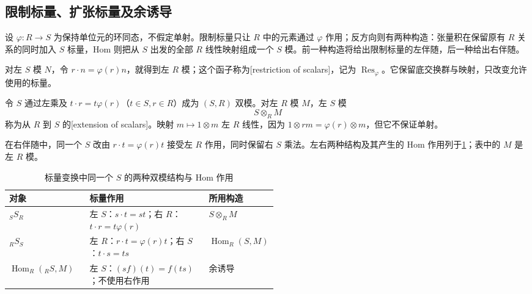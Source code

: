 \subsection{限制标量、扩张标量及余诱导}
\label{b2:subsec:0603:03}

设 \(\varphi:R\to S\) 为保持单位元的环同态，不假定单射。限制标量只让 \(R\) 中的元素通过 \(\varphi\) 作用；反方向则有两种构造：张量积在保留原有 \(R\) 关系的同时加入 \(S\) 标量，Hom 则把从 \(S\) 出发的全部 \(R\) 线性映射组成一个 \(S\) 模。前一种构造将给出限制标量的左伴随，后一种给出右伴随。

\ProseParagraphBreak
对左 \(S\) 模 \(N\)，令 \(r\cdot n=\varphi(r)n\)，就得到左 \(R\) 模；这个函子称为[restriction of scalars]，记为 \(\operatorname{Res}_{\varphi}\)。它保留底交换群与映射，只改变允许使用的标量。

\ProseParagraphBreak
令 \(S\) 通过左乘及 \(t\cdot r=t\varphi(r)\)（\(t\in S,r\in R\)）成为 \((S,R)\) 双模。对左 \(R\) 模 \(M\)，左 \(S\) 模
\[
	S\otimes_RM
\]
称为从 \(R\) 到 \(S\) 的[extension of scalars]。映射 \(m\mapsto1\otimes m\) 左 \(R\) 线性，因为 \(1\otimes rm=\varphi(r)\otimes m\)，但它不保证单射。

\ProseParagraphBreak
在右伴随中，同一个 \(S\) 改由 \(r\cdot t=\varphi(r)t\) 接受左 \(R\) 作用，同时保留右 \(S\) 乘法。左右两种结构及其产生的 Hom 作用列于\cref{b2:tab:scalar-change-sides}；表中的 \(M\) 是左 \(R\) 模。
\begin{table}[htbp]
	\centering
	\caption[标量变换的作用侧别]{标量变换中同一个 \(S\) 的两种双模结构与 Hom 作用}
	\label{b2:tab:scalar-change-sides}
	\begin{tabularx}{\linewidth}{@{}p{0.30\linewidth}X p{0.21\linewidth}@{}}
		\toprule
		对象 & 标量作用 & 所用构造 \\
		\midrule
		\({}_SS_R\) & 左 \(S\)：\(s\cdot t=st\)；右 \(R\)：\(t\cdot r=t\varphi(r)\) & \(S\otimes_RM\) \\
		\({}_RS_S\) & 左 \(R\)：\(r\cdot t=\varphi(r)t\)；右 \(S\)：\(t\cdot s=ts\) & \(\operatorname{Hom}_R(S,M)\) \\
		\(\operatorname{Hom}_R({}_RS,M)\) & 左 \(S\)：\((sf)(t)=f(ts)\)；不使用右作用 & 余诱导 \\
		\bottomrule
	\end{tabularx}
\end{table}

